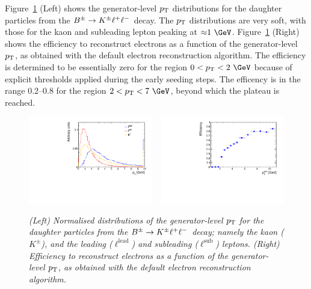Figure~\ref{fig:ele_acc_x_eff} (Left) shows the generator-level $p_\mathrm{T}$
distributions for the daughter particles from the $B^{\pm}\to K^{\pm} \ell^+\ell^-$ decay. The
$p_\mathrm{T}$ distributions are very soft, with those for the kaon and
subleading lepton peaking at
${\approx}1~\GeV$. Figure~\ref{fig:ele_acc_x_eff} (Right) shows the
efficiency to reconstruct electrons as a function of the
generator-level $p_\mathrm{T}$, as obtained with the default electron
reconstruction algorithm. The efficiency is determined to be
essentially zero for the region $0 < \pt < 2~\GeV$ because of explicit
thresholds applied during the early seeding steps. The efficency is in
the range 0.2--0.8 for the region $2 < \pt < 7~\GeV$, beyond which the
plateau is reached.

\begin{figure}[!h]
  \centering
  \includegraphics[width=0.48\textwidth]{figures/BKLL_acc.pdf} ~
  \includegraphics[width=0.48\textwidth]{figures/BKLL_eff.pdf} \\
  \caption{\it (Left) Normalised distributions of the generator-level
    $p_\mathrm{T}$ for the daughter particles from the $B^{\pm}\to K^{\pm} \ell^+\ell^-$ decay; namely the
    kaon ($K^\pm$), and the leading ($\ell^\mathrm{lead}$) and
    subleading ($\ell^\mathrm{sub}$) leptons. 
    (Right) Efficiency to reconstruct electrons as a function of the
    generator-level $p_\mathrm{T}$, as obtained with the default electron
    reconstruction algorithm.  
  \label{fig:ele_acc_x_eff}}
\end{figure}


